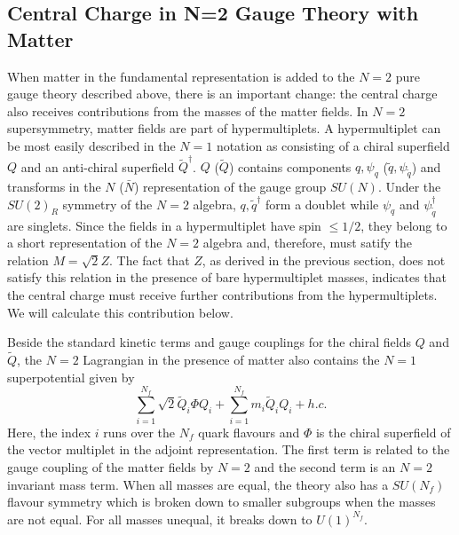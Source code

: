 \subsection{Central Charge in N=2 Gauge Theory with Matter}

When matter in the fundamental representation is added to the $N=2$
pure gauge theory described above, there is an important change: the
central charge also receives contributions from the masses of the
matter fields. In $N=2$ supersymmetry, matter fields are part of
hypermultiplets. A hypermultiplet can be most easily described in the
$N=1$ notation as consisting of a chiral superfield $Q$ and an
anti-chiral superfield $\widetilde Q^\dagger$. $Q$ ($\widetilde Q$)
contains components $q,\psi_q$ ($\widetilde q,\psi_{\widetilde q}$)
and transforms in the $N$ ($\bar{N}$) representation of the gauge
group $SU(N)$. Under the $SU(2)_{R}$ symmetry of the $N=2$ algebra,
$q,\widetilde q^\dagger$ form a doublet while $\psi_q$ and
$\psi^\dagger_{\tilde q}$ are singlets. Since the fields in a
hypermultiplet have spin $\leq 1/2$, they belong to a short
representation of the $N=2$ algebra and, therefore, must satify the
relation $M=\sqrt{2} Z$. The fact that $Z$, as derived in the previous
section, does not satisfy this relation in the presence of bare
hypermultiplet masses, indicates that the central charge must receive
further contributions from the hypermultiplets. We will calculate this
contribution below. 

Beside the standard kinetic terms and gauge couplings for the chiral
fields $Q$ and $\widetilde Q$, the $N=2$ Lagrangian in the presence of
matter also contains the $N=1$ superpotential given by 
$$
\sum_{i=1}^{N_f}\sqrt{2}\widetilde{Q}_i\Phi Q_i+\sum_{i=1}^{N_f} m_i 
\widetilde{Q}_i Q_i + h.c.
$$
Here, the index $i$ runs over the $N_f$ quark flavours and $\Phi$ is
the chiral superfield of the vector multiplet in the adjoint
representation. The first term is related to the gauge coupling of
the matter fields by $N=2$ and the second term is an $N=2$ invariant
mass term. When all masses are equal, the theory also has a $SU(N_f)$
flavour symmetry which is broken down to smaller subgroups when the
masses are not equal. For all masses unequal, it breaks down to
$U(1)^{N_f}$.  

